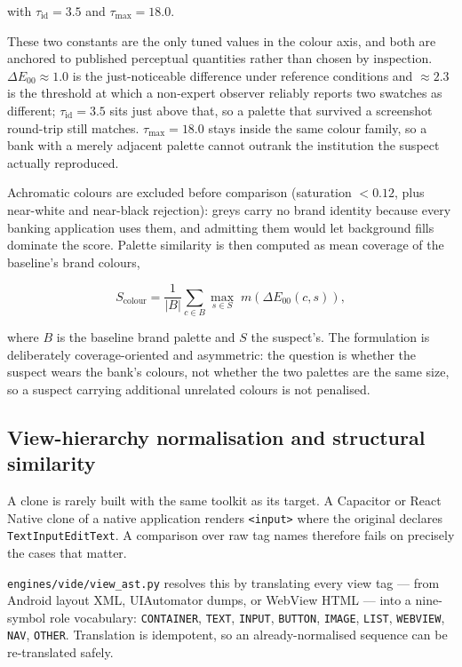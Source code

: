 \documentclass{article}
\begin{document}
with $\tau_{\mathrm{id}} = 3.5$ and $\tau_{\max} = 18.0$.

These two constants are the only tuned values in the colour axis, and both are
anchored to published perceptual quantities rather than chosen by inspection.
$\Delta E_{00} \approx 1.0$ is the just-noticeable difference under reference
conditions and $\approx 2.3$ is the threshold at which a non-expert observer
reliably reports two swatches as different; $\tau_{\mathrm{id}} = 3.5$ sits
just above that, so a palette that survived a screenshot round-trip still
matches. $\tau_{\max} = 18.0$ stays inside the same colour family, so a bank
with a merely adjacent palette cannot outrank the institution the suspect
actually reproduced.

Achromatic colours are excluded before comparison (saturation $< 0.12$, plus
near-white and near-black rejection): greys carry no brand identity because
every banking application uses them, and admitting them would let background
fills dominate the score. Palette similarity is then computed as mean coverage
of the baseline's brand colours,

\begin{equation}
S_{\mathrm{colour}} = \frac{1}{|B|}\sum_{c \in B}
\max_{s \in S} \; m\!\left(\Delta E_{00}(c, s)\right),
\label{eq:palette}
\end{equation}

where $B$ is the baseline brand palette and $S$ the suspect's. The formulation
is deliberately coverage-oriented and asymmetric: the question is whether the
suspect wears the bank's colours, not whether the two palettes are the same
size, so a suspect carrying additional unrelated colours is not penalised.

\subsection{View-hierarchy normalisation and structural similarity}
\label{ssec:vide-ast}

A clone is rarely built with the same toolkit as its target. A Capacitor or
React Native clone of a native application renders \texttt{<input>} where the
original declares \texttt{TextInputEditText}. A comparison over raw tag names
therefore fails on precisely the cases that matter.

\texttt{engines/vide/view\_ast.py} resolves this by translating every view tag
--- from Android layout XML, UIAutomator dumps, or WebView HTML --- into a
nine-symbol role vocabulary: \texttt{CONTAINER}, \texttt{TEXT}, \texttt{INPUT},
\texttt{BUTTON}, \texttt{IMAGE}, \texttt{LIST}, \texttt{WEBVIEW}, \texttt{NAV},
\texttt{OTHER}. Translation is idempotent, so an already-normalised sequence can
be re-translated safely.
\end{document}
